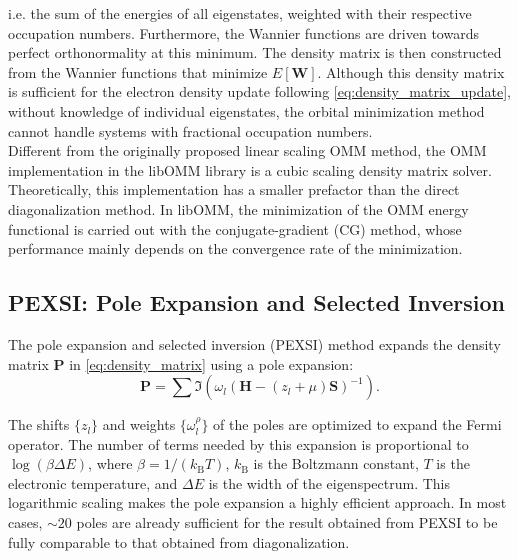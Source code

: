 \documentclass{report}
\begin{document}
\noindent i.e. the sum of the energies of all eigenstates, weighted with their respective occupation numbers.  Furthermore, the Wannier functions are driven towards perfect orthonormality at this minimum.  The density matrix is then constructed from the Wannier functions that minimize $E[\boldsymbol{W}]$.  Although this density matrix is sufficient for the electron density update following \ref{eq:density_matrix_update}, without knowledge of individual eigenstates, the orbital minimization method cannot handle systems with fractional occupation numbers.\\

Different from the originally proposed linear scaling OMM method, the OMM implementation in the libOMM library \cite{libomm_corsetti_2014} is a cubic scaling density matrix solver.  Theoretically, this implementation has a smaller prefactor than the direct diagonalization method.  In libOMM, the minimization of the OMM energy functional is carried out with the conjugate-gradient (CG) method, whose performance mainly depends on the convergence rate of the minimization.\\

\subsection{PEXSI:  Pole Expansion and Selected Inversion}
\label{subsec:solvers_pexsi}
The pole expansion and selected inversion (PEXSI) method \cite{pexsi_lin_2009,pexsi_lin_2013} expands the density matrix $\boldsymbol{P}$ in \ref{eq:density_matrix} using a pole expansion:\\
\begin{equation}
\label{eq:pole}
\boldsymbol{P} = \sum \Im \left( \omega_l (\boldsymbol{H} - (z_l + \mu) \boldsymbol{S})^{-1} \right) .
\end{equation}

\noindent The shifts $\{z_{l}\}$ and weights $\{\omega^{\rho}_l\}$ of the poles are optimized to expand the Fermi operator.  The number of terms needed by this expansion is proportional to $\log(\beta\Delta E)$, where $\beta = 1/(k_\text{B} T)$, $k_\text{B}$ is the Boltzmann constant, $T$ is the electronic temperature, and $\Delta E$ is the width of the eigenspectrum.  This logarithmic scaling makes the pole expansion a highly efficient approach.  In most cases, $\sim 20$ poles are already sufficient for the result obtained from PEXSI to be fully comparable to that obtained from diagonalization.\\
\end{document}
